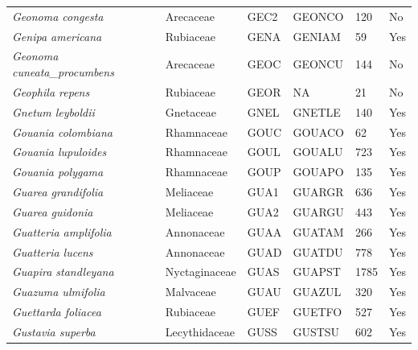\documentclass[11pt]{article}
\begin{document}
\begin{longtable}{@{}llllll@{}}
\textit{Geonoma congesta}                             & Arecaceae        & GEC2   & GEONCO & 120             & No        \\
\textit{Genipa americana}                             & Rubiaceae        & GENA   & GENIAM & 59              & Yes       \\
\textit{Geonoma cuneata\_procumbens}                  & Arecaceae        & GEOC   & GEONCU & 144             & No        \\
\textit{Geophila repens}                              & Rubiaceae        & GEOR   & NA     & 21              & No        \\
\textit{Gnetum leyboldii}                             & Gnetaceae        & GNEL   & GNETLE & 140             & Yes       \\
\textit{Gouania colombiana}                           & Rhamnaceae       & GOUC   & GOUACO & 62              & Yes       \\
\textit{Gouania lupuloides}                           & Rhamnaceae       & GOUL   & GOUALU & 723             & Yes       \\
\textit{Gouania polygama}                             & Rhamnaceae       & GOUP   & GOUAPO & 135             & Yes       \\
\textit{Guarea grandifolia}                           & Meliaceae        & GUA1   & GUARGR & 636             & Yes       \\
\textit{Guarea guidonia}                              & Meliaceae        & GUA2   & GUARGU & 443             & Yes       \\
\textit{Guatteria amplifolia}                         & Annonaceae       & GUAA   & GUATAM & 266             & Yes       \\
\textit{Guatteria lucens}                             & Annonaceae       & GUAD   & GUATDU & 778             & Yes       \\
\textit{Guapira standleyana}                          & Nyctaginaceae    & GUAS   & GUAPST & 1785            & Yes       \\
\textit{Guazuma ulmifolia}                            & Malvaceae        & GUAU   & GUAZUL & 320             & Yes       \\
\textit{Guettarda foliacea}                           & Rubiaceae        & GUEF   & GUETFO & 527             & Yes       \\
\textit{Gustavia superba}                             & Lecythidaceae    & GUSS   & GUSTSU & 602             & Yes       \\

\end{longtable}
\end{document}
